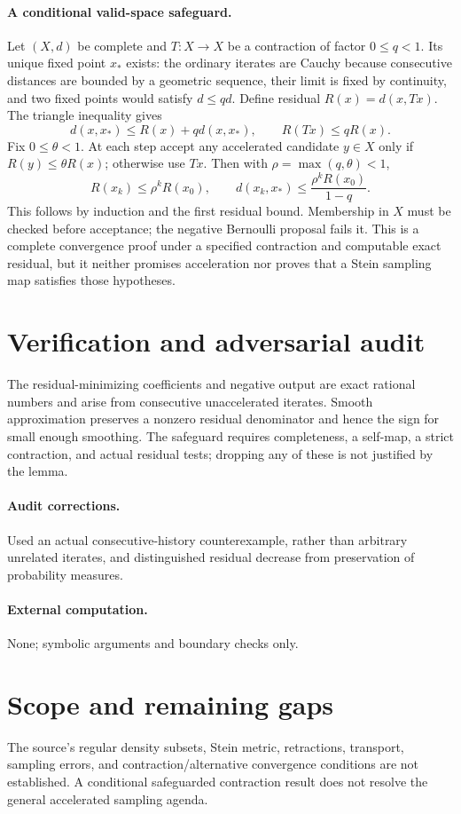 \documentclass[11pt]{article}
\begin{document}
\paragraph{A conditional valid-space safeguard.}
Let $(X,d)$ be complete and $T:X\to X$ be a contraction of factor $0\leq q<1$. Its unique fixed point $x_*$ exists: the ordinary iterates are Cauchy because consecutive distances are bounded by a geometric sequence, their limit is fixed by continuity, and two fixed points would satisfy $d\leq qd$. Define residual $R(x)=d(x,Tx)$. The triangle inequality gives
\[
d(x,x_*)\leq R(x)+q d(x,x_*),\qquad
R(Tx)\leq q R(x).
\]
Fix $0\leq\theta<1$. At each step accept any accelerated candidate $y\in X$ only if $R(y)\leq\theta R(x)$; otherwise use $Tx$. Then with $\rho=\max(q,\theta)<1$,
\[
R(x_k)\leq\rho^kR(x_0),\qquad
d(x_k,x_*)\leq\frac{\rho^kR(x_0)}{1-q}.
\]
This follows by induction and the first residual bound. Membership in $X$ must be checked before acceptance; the negative Bernoulli proposal fails it. This is a complete convergence proof under a specified contraction and computable exact residual, but it neither promises acceleration nor proves that a Stein sampling map satisfies those hypotheses.
\section{Verification and adversarial audit}
The residual-minimizing coefficients and negative output are exact rational numbers and arise from consecutive unaccelerated iterates. Smooth approximation preserves a nonzero residual denominator and hence the sign for small enough smoothing. The safeguard requires completeness, a self-map, a strict contraction, and actual residual tests; dropping any of these is not justified by the lemma.
\paragraph{Audit corrections.} Used an actual consecutive-history counterexample, rather than arbitrary unrelated iterates, and distinguished residual decrease from preservation of probability measures.
\paragraph{External computation.} None; symbolic arguments and boundary checks only.
\section{Scope and remaining gaps}
The source's regular density subsets, Stein metric, retractions, transport, sampling errors, and contraction/alternative convergence conditions are not established. A conditional safeguarded contraction result does not resolve the general accelerated sampling agenda.
\end{document}
